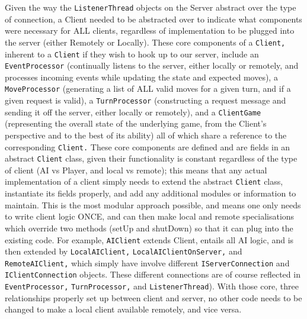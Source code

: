 \documentclass[a4paper,doc]{apa6}
\newcommand{\code}{\texttt}
\begin{document}
Given the way the \code{ListenerThread} objects on the Server abstract over the type of connection, a Client needed to be abstracted over to indicate what components were necessary for ALL clients, regardless of implementation to be plugged into the server (either Remotely or Locally). These core components of a \code{Client,} inherent to a \code{Client} if they wish to hook up to our server, include an \code{EventProcessor} (continually listens to the server, either locally or remotely, and processes incoming events while updating the state and expected moves), a \code{MoveProcessor} (generating a list of ALL valid moves for a given turn, and if a given request is valid), a \code{TurnProcessor} (constructing a request message and sending it off the server, either locally or remotely), and a \code{ClientGame} (representing the overall state of the underlying game, from the Client’s perspective and to the best of its ability) all of which share a reference to the corresponding \code{Client.} These core components are defined and are fields in an abstract \code{Client} class, given their functionality is constant regardless of the type of client (AI vs Player, and local vs remote); this means that any actual implementation of a client simply needs to extend the abstract \code{Client} class, instantiate its fields properly, and add any additional modules or information to maintain. This is the most modular approach possible, and means one only needs to write client logic ONCE, and can then make local and remote specialisations which override two methods (setUp and shutDown) so that it can plug into the existing code. For example, \code{AIClient} extends Client, entails all AI logic, and is then extended by \code{LocalAIClient,} \code{LocalAIClientOnServer,} and \code{RemoteAIClient,} which simply have involve different \code{IServerConnection} and \code{IClientConnection} objects. These different connections are of course reflected in \code{EventProcessor,} \code{TurnProcessor,} and \code{ListenerThread}). With those core, three relationships properly set up between client and server, no other code needs to be changed to make a local client available remotely, and vice versa.
\end{document}
